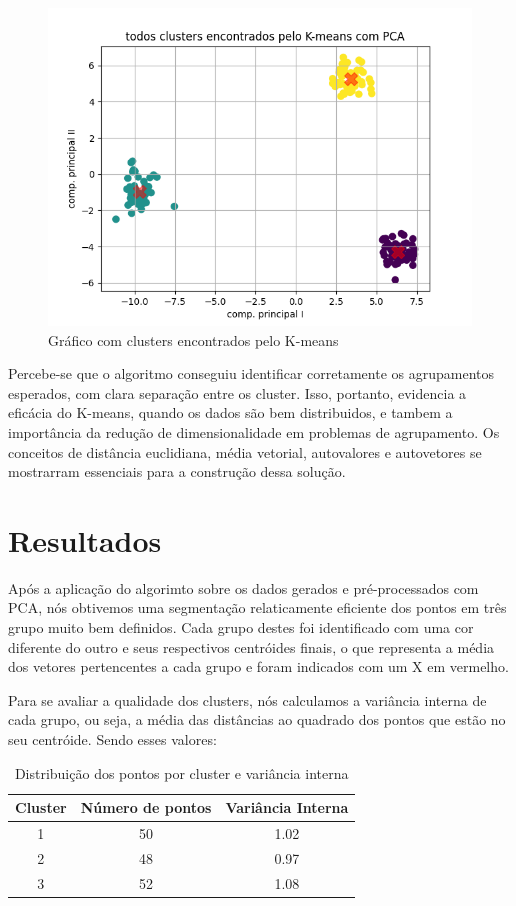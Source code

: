 \documentclass[a4paper,12pt]{article}
\begin{document}
\begin{figure}[!h]
\centering
\includegraphics[width=12cm,trim = 0cm 0cm 0cm 0cm,clip]{clusterss.png}
\caption{Gráfico com clusters encontrados pelo K-means}
\label{fig:nao sei o que tem que botar aqui}
\end{figure}

Percebe-se que o algoritmo conseguiu identificar corretamente os agrupamentos esperados, com clara separação entre os cluster. Isso, portanto, evidencia a eficácia do K-means, quando os dados são bem distribuidos, e tambem a importância da redução de dimensionalidade em problemas de agrupamento. Os conceitos de distância euclidiana, média vetorial, autovalores e autovetores se mostrarram essenciais para a construção dessa solução.


\section{Resultados}

Após a aplicação do algorimto sobre os dados gerados e pré-processados com PCA, nós obtivemos uma segmentação relaticamente eficiente dos pontos em três grupo muito bem definidos. Cada grupo destes foi identificado com uma cor diferente do outro e seus respectivos centróides finais, o que representa a média dos vetores pertencentes a cada grupo e foram indicados com um X em vermelho.

Para se avaliar a qualidade dos clusters, nós calculamos a variância interna de cada grupo, ou seja, a média das distâncias ao quadrado dos pontos que estão no seu centróide. Sendo esses valores: 

\begin{table}[H]
\centering
\begin{tabular}{|c|c|c|}
\hline
Cluster & Número de pontos & Variância Interna \\
\hline
1 & 50 & 1.02 \\
2 & 48 & 0.97 \\
3 & 52 & 1.08 \\
\hline
\end{tabular}
\caption{Distribuição dos pontos por cluster e variância interna }
\end{table}
\end{document}
